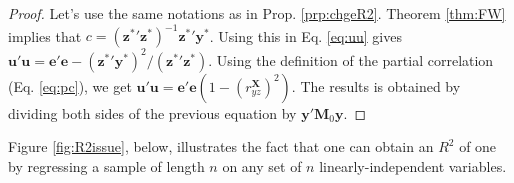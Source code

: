 \documentclass[
  12pt,
]{book}
\theoremstyle{definition}
\theoremstyle{definition}
\theoremstyle{definition}
\theoremstyle{definition}
\theoremstyle{remark}
\begin{document}
\begin{proof}
Let's use the same notations as in Prop. \ref{prp:chgeR2}. Theorem \ref{thm:FW} implies that \(c = (\mathbf{z^*}'\mathbf{z^*})^{-1}\mathbf{z^*}'\mathbf{y^*}\). Using this in Eq. \eqref{eq:uu} gives \(\mathbf{u}'\mathbf{u} = \mathbf{e}'\mathbf{e} - (\mathbf{z^*}'\mathbf{y^*})^2/(\mathbf{z^*}'\mathbf{z^*})\). Using the definition of the partial correlation (Eq. \eqref{eq:pc}), we get \(\mathbf{u}'\mathbf{u} = \mathbf{e}'\mathbf{e}\left(1 - (r_{yz}^\mathbf{X})^2\right)\). The results is obtained by dividing both sides of the previous equation by \(\mathbf{y}'\mathbf{M}_0\mathbf{y}\).
\end{proof}

Figure \ref{fig:R2issue}, below, illustrates the fact that one can obtain an \(R^2\) of one by regressing a sample of length \(n\) on any set of \(n\) linearly-independent variables.
\end{document}
